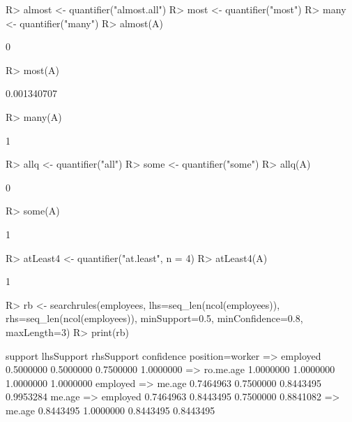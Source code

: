 \documentclass{article}\usepackage[]{graphicx}\usepackage[]{color}
\begin{document}
\begin{Schunk}
% --begin: "quant5"
\begin{Sinput}
R> almost <- quantifier("almost.all")
R> most <- quantifier("most")
R> many <- quantifier("many")
R> almost(A)
\end{Sinput}
\begin{Soutput}
[1] 0
\end{Soutput}
\begin{Sinput}
R> most(A)
\end{Sinput}
\begin{Soutput}
[1] 0.001340707
\end{Soutput}
\begin{Sinput}
R> many(A)
\end{Sinput}
\begin{Soutput}
[1] 1
\end{Soutput}
%
% --end: "quant5"
\end{Schunk}

\begin{Schunk}
% --begin: "quant6"
\begin{Sinput}
R> allq <- quantifier("all")
R> some <- quantifier("some")
R> allq(A)
\end{Sinput}
\begin{Soutput}
[1] 0
\end{Soutput}
\begin{Sinput}
R> some(A)
\end{Sinput}
\begin{Soutput}
[1] 1
\end{Soutput}
%
% --end: "quant6"
\end{Schunk}

\begin{Schunk}
% --begin: "quant7"
\begin{Sinput}
R> atLeast4 <- quantifier("at.least", n = 4)
R> atLeast4(A)
\end{Sinput}
\begin{Soutput}
[1] 1
\end{Soutput}
%
% --end: "quant7"
\end{Schunk}

\begin{Schunk}
% --begin: "searchrules"
\begin{Sinput}
R> rb <- searchrules(employees,
                     lhs=seq_len(ncol(employees)),
                     rhs=seq_len(ncol(employees)),
                     minSupport=0.5,
                     minConfidence=0.8,
                     maxLength=3)
R> print(rb)
\end{Sinput}
\begin{Soutput}
                              support lhsSupport rhsSupport confidence
position=worker => employed 0.5000000  0.5000000  0.7500000  1.0000000
 => ro.me.age               1.0000000  1.0000000  1.0000000  1.0000000
employed => me.age          0.7464963  0.7500000  0.8443495  0.9953284
me.age => employed          0.7464963  0.8443495  0.7500000  0.8841082
 => me.age                  0.8443495  1.0000000  0.8443495  0.8443495
\end{Soutput}
%
% --end: "searchrules"
\end{Schunk}
\end{document}
